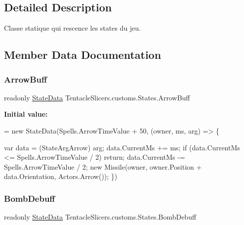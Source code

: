 \subsection{Detailed Description}
Classe statique qui rescence les states du jeu. 



\subsection{Member Data Documentation}
\mbox{\label{class_tentacle_slicers_1_1customs_1_1_states_ae2aea1435dd7e823359ee4c2e77a9afd}} 
\subsubsection{\texorpdfstring{Arrow\+Buff}{ArrowBuff}}
{\footnotesize\ttfamily readonly \hyperlink{class_tentacle_slicers_1_1states_1_1_state_data}{State\+Data} Tentacle\+Slicers.\+customs.\+States.\+Arrow\+Buff\hspace{0.3cm}{\ttfamily [static]}}

{\bfseries Initial value\+:}
\begin{DoxyCode}
= \textcolor{keyword}{new} StateData(Spells.ArrowTimeValue + 50, (owner, ms, arg) =>
        \{
            
            var data = (StateArgArrow) arg;
            data.CurrentMs += ms;
            if (data.CurrentMs <= Spells.ArrowTimeValue / 2) return;
            data.CurrentMs -= Spells.ArrowTimeValue / 2;
            new Missile(owner, owner.Position + data.Orientation, Actors.Arrow());
        \})
\end{DoxyCode}
\mbox{\label{class_tentacle_slicers_1_1customs_1_1_states_abae86f714fd3531b1785dccffba32f18}} 
\subsubsection{\texorpdfstring{Bomb\+Debuff}{BombDebuff}}
{\footnotesize\ttfamily readonly \hyperlink{class_tentacle_slicers_1_1states_1_1_state_data}{State\+Data} Tentacle\+Slicers.\+customs.\+States.\+Bomb\+Debuff\hspace{0.3cm}{\ttfamily [static]}}

